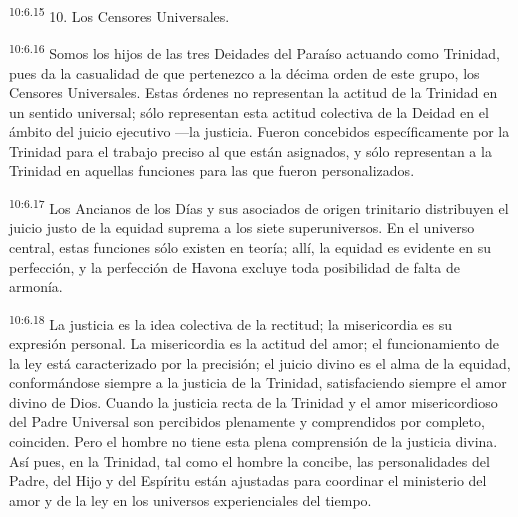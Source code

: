\par
\textsuperscript{10:6.15} 10. Los Censores Universales.

\par
\textsuperscript{10:6.16} Somos los hijos de las tres Deidades del Paraíso actuando como Trinidad, pues da la casualidad de que pertenezco a la décima orden de este grupo, los Censores Universales. Estas órdenes no representan la actitud de la Trinidad en un sentido universal; sólo representan esta actitud colectiva de la Deidad en el ámbito del juicio ejecutivo ---la justicia. Fueron concebidos específicamente por la Trinidad para el trabajo preciso al que están asignados, y sólo representan a la Trinidad en aquellas funciones para las que fueron personalizados.

\par
\textsuperscript{10:6.17} Los Ancianos de los Días y sus asociados de origen trinitario distribuyen el juicio justo de la equidad suprema a los siete superuniversos. En el universo central, estas funciones sólo existen en teoría; allí, la equidad es evidente en su perfección, y la perfección de Havona excluye toda posibilidad de falta de armonía.

\par
\textsuperscript{10:6.18} La justicia es la idea colectiva de la rectitud; la misericordia es su expresión personal. La misericordia es la actitud del amor; el funcionamiento de la ley está caracterizado por la precisión; el juicio divino es el alma de la equidad, conformándose siempre a la justicia de la Trinidad, satisfaciendo siempre el amor divino de Dios. Cuando la justicia recta de la Trinidad y el amor misericordioso del Padre Universal son percibidos plenamente y comprendidos por completo, coinciden. Pero el hombre no tiene esta plena comprensión de la justicia divina. Así pues, en la Trinidad, tal como el hombre la concibe, las personalidades del Padre, del Hijo y del Espíritu están ajustadas para coordinar el ministerio del amor y de la ley en los universos experienciales del tiempo.

